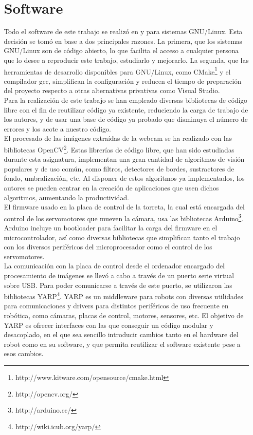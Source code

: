 \newpage

\section{Software}
Todo el software de este trabajo se realizó en y para sistemas GNU/Linux. Esta decisión se tomó en base a dos principales razones. La primera, que los sistemas GNU/Linux son de código abierto, lo que facilita el acceso a cualquier persona que lo desee a reproducir este trabajo, estudiarlo y mejorarlo. La segunda, que las herramientas de desarrollo disponibles para GNU/Linux, como CMake\footnote{http://www.kitware.com/opensource/cmake.html} y el compilador gcc, simplifican la configuración y reducen el tiempo de preparación del proyecto respecto a otras alternativas privativas como Visual Studio.\\

Para la realización de este trabajo se han empleado diversas bibliotecas de código libre con el fin de reutilizar código ya existente, reduciendo la carga de trabajo de los autores, y de usar una base de código ya probado que disminuya el número de errores y los acote a nuestro código.\\

El procesado de las imágenes extraídas de la webcam se ha realizado con las bibliotecas OpenCV\footnote{http://opencv.org/}. Estas librerías de código libre, que han sido estudiadas durante esta asignatura, implementan una gran cantidad de algoritmos de visión populares y de uso común, como filtros, detectores de bordes, sustractores de fondo, umbralización, etc. Al disponer de estos algoritmos ya implementados, los autores se pueden centrar  en la creación de aplicaciones que usen dichos algoritmos, aumentando la productividad.\\

El firmware usado en la placa de control de la torreta, la cual está encargada del control de los servomotores que mueven la cámara, usa las bibliotecas Arduino\footnote{http://arduino.cc/}. Arduino incluye un bootloader para facilitar la carga del firmware en el microcontrolador, así como diversas bibliotecas que simplifican tanto el trabajo con los diversos periféricos del microprocesador como el control de los servomotores.\\

La comunicación con la placa de control desde el ordenador encargado del procesamiento de imágenes se llevó a cabo a través de un puerto serie virtual sobre USB. Para poder comunicarse a través de este puerto, se utilizaron las bibliotecas YARP\footnote{http://wiki.icub.org/yarp/}. YARP es un middleware para robots con diversas utilidades para comunicaciones y drivers para distintos periféricos de uso frecuente en robótica, como cámaras, placas de control, motores, sensores, etc. El objetivo de YARP es ofrecer interfaces con las que conseguir un código modular y desacoplado, en el que sea sencillo introducir cambios tanto en el hardware del robot como en su software, y que permita reutilizar el software existente pese a esos cambios.\\

